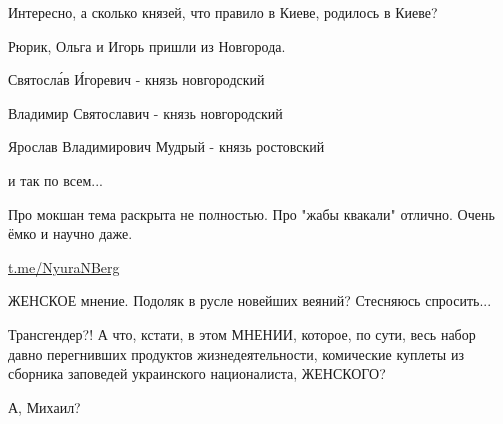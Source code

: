 \begin{itemize}
Интересно, а сколько князей, что правило в Киеве, родилось в Киеве?

Рюрик, Ольга и Игорь пришли из Новгорода.

Святосла́в И́горевич - князь новгородский

Владимир Святославич - князь новгородский

Ярослав Владимирович Мудрый - князь ростовский

и так по всем...


Про мокшан тема раскрыта не полностью. Про "жабы квакали" отлично. Очень ёмко и научно даже.


\par
\url{t.me/NyuraNBerg}
 

ЖЕНСКОЕ мнение. Подоляк в русле новейших веяний? Стесняюсь спросить...

Трансгендер?! А что, кстати, в этом МНЕНИИ, которое, по сути, весь набор давно
перегнивших продуктов жизнедеятельности, комические куплеты из сборника
заповедей украинского националиста, ЖЕНСКОГО? 

А, Михаил?


\end{itemize}

